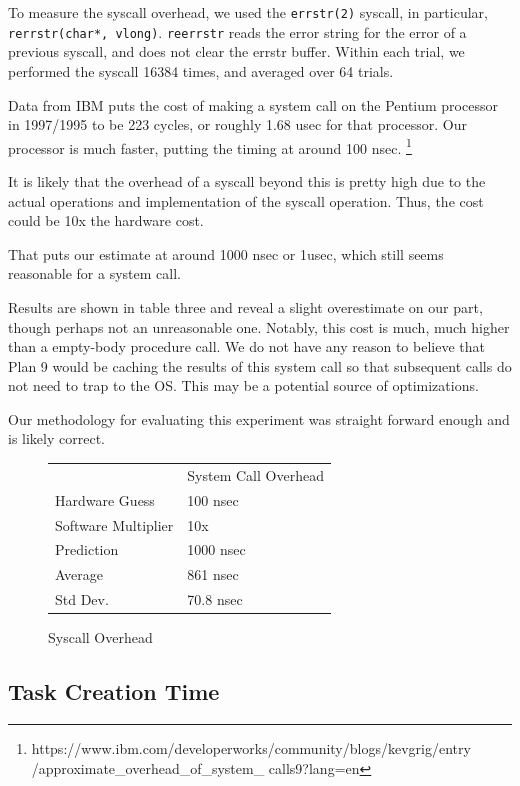 \documentclass[letterpaper,twocolumn,10pt]{article}
\begin{document}
To measure the syscall overhead, we used the \texttt{errstr(2)} syscall, in
particular, \texttt{rerrstr(char*, vlong)}. \texttt{reerrstr} reads the error
string for the error of a previous syscall, and does not clear the errstr
buffer. Within each trial, we performed the syscall 16384 times, and averaged
over 64 trials.

Data from IBM puts the cost of making a system call on the Pentium processor in 1997/1995
to be 223 cycles, or roughly 1.68 usec for that processor. Our processor is much faster,
putting the timing at around 100 nsec.
\footnote{https://www.ibm.com/developerworks/community/blogs/kevgrig/entry 
/approximate\_overhead\_of\_system\_ calls9?lang=en}

It is likely that the overhead of a syscall beyond this is pretty high due to
the actual operations and implementation of the syscall operation. Thus, the
cost could be 10x the hardware cost.

That puts our estimate at around 1000 nsec or 1usec, which still seems reasonable for a system call.

Results are shown in table three and reveal a slight overestimate on our part, though perhaps not an 
unreasonable one. Notably, this cost is much, much higher than a empty-body procedure call. We do not
have any reason to believe that Plan 9 would be caching the results of this system call so that subsequent
calls do not need to trap to the OS. This may be a potential source of optimizations.

Our methodology for evaluating this experiment was straight forward enough and is likely correct.

\begin{figure}
	\centering
    \begin{tabular}{ll}
            & System Call Overhead \\
    Hardware Guess  & 100 nsec  \\
    Software Multiplier  & 10x \\  
    Prediction  & 1000 nsec \\
    Average  & 861 nsec\\
    Std Dev. & 70.8 nsec          
    \end{tabular}
\caption{Syscall Overhead}
\label{tab:syscalloverheads}
\end{figure}

\subsection{Task Creation Time}
\end{document}
